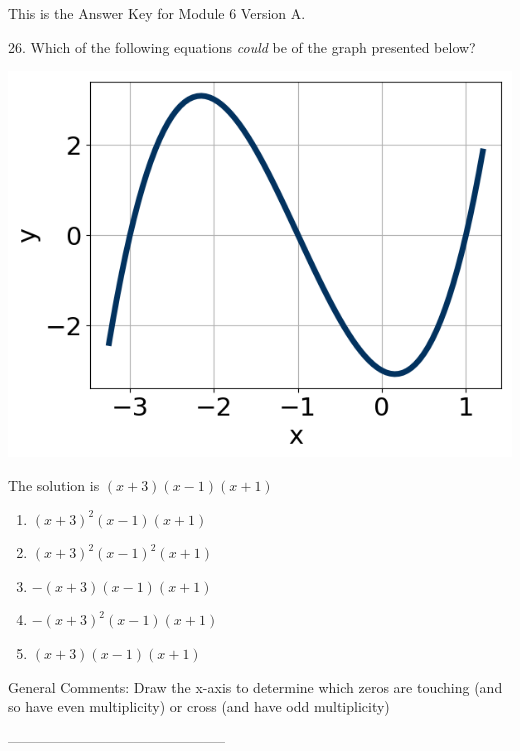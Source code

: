 \documentclass{article}[10pt]
\begin{document}
This is the Answer Key for Module 6 Version A.

26. Which of the following equations \textit{could} be of the graph presented below?
$$  $$ 
\begin{center}\includegraphics[scale=0.5]{../Figures/question26A.png}\end{center}The solution is $ (x + 3)(x - 1)(x + 1) $ 

\begin{enumerate}[label=\Alph*.] 
\item $ (x + 3)^2(x - 1)(x + 1) $ 

  
\item $ (x + 3)^2(x - 1)^2(x + 1) $ 

  
\item $ -(x + 3)(x - 1)(x + 1) $ 

  
\item $ -(x + 3)^2(x - 1)(x + 1) $ 

  
\item $ (x + 3)(x - 1)(x + 1) $ 

  
\end{enumerate} 
 
General Comments: Draw the x-axis to determine which zeros are touching (and so have even multiplicity) or cross (and have odd multiplicity)

-----------------------------------------------
\end{document}

